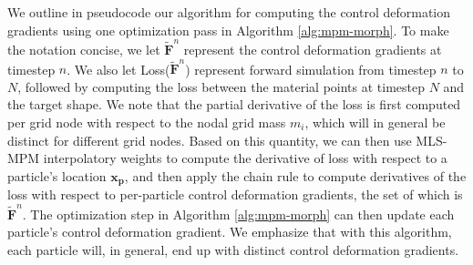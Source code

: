     We outline in pseudocode our algorithm for computing the control deformation gradients using one optimization pass in Algorithm \ref{alg:mpm-morph}.
    To make the notation concise, we let $\tilde{\mathbf{F}}^n$ represent the control deformation gradients at timestep $n$.
    We also let Loss($\tilde{\mathbf{F}}^n$) represent forward simulation from timestep $n$ to $N$, followed by computing the loss between the material points at timestep $N$ and the target shape.
    We note that the partial derivative of the loss is first computed per grid node with respect to the nodal grid mass $m_i$, which will in general be distinct for different grid nodes. 
    Based on this quantity, we can then use MLS-MPM interpolatory weights to compute the derivative of loss with respect to a particle's location $\mathbf{x_p}$, and then apply the chain rule to compute derivatives of the loss with respect to per-particle control deformation gradients, the set of which is $\tilde{\mathbf{F}}^n$.
    The optimization step in Algorithm \ref{alg:mpm-morph} can then update each particle's control deformation gradient. We emphasize that with this algorithm, each particle will, in general, end up with distinct control deformation gradients.


